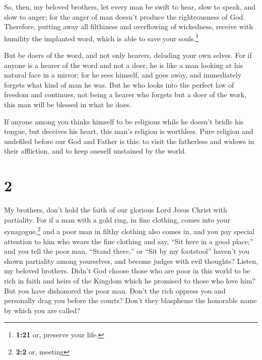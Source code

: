  So, then, my beloved brothers, let every man be swift to
hear, slow to speak, and slow to anger;  for the anger of
man doesn't produce the righteousness of God.  Therefore,
putting away all filthiness and overflowing of wickedness, receive with
humility the implanted word, which is able to save your
souls.\footnote{\textbf{1:21} or, preserve your life.}

 But be doers of the word, and not only hearers, deluding
your own selves.  For if anyone is a hearer of the word
and not a doer, he is like a man looking at his natural face in a
mirror;  for he sees himself, and goes away, and
immediately forgets what kind of man he was.  But he who
looks into the perfect law of freedom and continues, not being a hearer
who forgets but a doer of the work, this man will be blessed in what he
does.

 If anyone among you thinks himself to be religious while
he doesn't bridle his tongue, but deceives his heart, this man's
religion is worthless.  Pure religion and undefiled
before our God and Father is this: to visit the fatherless and widows in
their affliction, and to keep oneself unstained by the world.

\hypertarget{section-1}{%
\section{2}\label{section-1}}

 My brothers, don't hold the faith of our glorious Lord
Jesus Christ with partiality.  For if a man with a gold
ring, in fine clothing, comes into your synagogue,\footnote{\textbf{2:2}
  or, meeting} and a poor man in filthy clothing also comes in,
 and you pay special attention to him who wears the fine
clothing and say, ``Sit here in a good place;'' and you tell the poor
man, ``Stand there,'' or ``Sit by my footstool''  haven't
you shown partiality among yourselves, and become judges with evil
thoughts?  Listen, my beloved brothers. Didn't God choose
those who are poor in this world to be rich in faith and heirs of the
Kingdom which he promised to those who love him?  But you
have dishonored the poor man. Don't the rich oppress you and personally
drag you before the courts?  Don't they blaspheme the
honorable name by which you are called?

